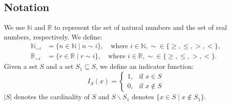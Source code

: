 \subsection{Notation}
\label{notation123}
We use \(\mathbb{N}\) and \(\mathbb{R}\) to represent the set of natural numbers and the set of real numbers, respectively. We define:
\begin{align*}
  \mathbb{N}_{\sim i} &= \{n \in \mathbb{N} \mid n \sim i\}, \quad \text{where } i \in \mathbb{N}, \sim \in \{\geq, \leq, >, <\}, \\
  \mathbb{R}_{\sim i} &= \{r \in \mathbb{R} \mid r \sim i\}, \quad \text{where } i \in \mathbb{R}, \sim \in \{\geq, \leq, >, <\}.
\end{align*}
Given a set \( S \) and a set $S_1 \subseteq S$, we define an indicator function:
$$I_S(x) =
  \begin{cases}
  1, & \text{if } x \in S \\
  0, & \text{if } x \not\in S
  \end{cases}$$
$|S|$ denotes the cardinality of $S$ and $S\backslash S_1$ denotes $\{x \in S \mid x \not\in S_1\}$.

